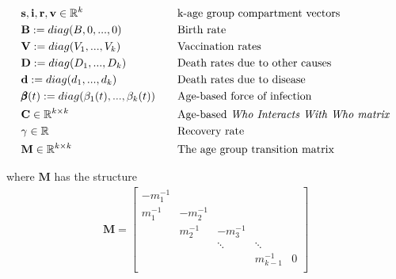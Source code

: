 \documentclass{article}
\theoremstyle{definition}
\begin{document}
\begin{align*}
&\mathbf{s}, \mathbf{i}, \mathbf{r} ,\mathbf{v}\in \mathbb{R}^k& \quad& \text{k-age group compartment vectors}\\
&\mathbf{B}:=diag(B,0,...,0)& \quad& \text{Birth rate}\\
&\mathbf{V}:=diag(V_1,...,V_k) &\quad& \text{Vaccination rates}\\
&\mathbf{D}:=diag(D_1,...,D_k) &\quad& \text{Death rates due to other causes}\\
&\mathbf{d}:=diag(d_1,...,d_k) &\quad& \text{Death rates due to disease}\\
&\pmb{\beta}(t):=diag(\beta_1(t),...,\beta_k(t))&\quad& \text{Age-based force of infection}\\
&\mathbf{C}\in \mathbb{R}^{k\times k} &\quad& \text{Age-based \emph{Who Interacts With Who matrix}}\\
&\gamma \in \mathbb{R}&\quad&\text{Recovery rate}\\
&\mathbf{M}\in\mathbb{R}^{k\times k}&\quad& \text{The age group transition matrix}
\end{align*}

  where $\mathbf{M}$ has the structure
\begin{gather*}
\mathbf{M}=\begin{bmatrix}
-m_1^{-1} &      &        &        &    \\
 m_1^{-1} & -m_2^{-1} &        &        &    \\
     &  m_2^{-1} & -m_3^{-1}   &        &    \\
     &      & \ddots & \ddots &    \\
     &      &		 & m_{k-1}^{-1}& 0\\
\end{bmatrix}
\end{gather*}
\end{document}
